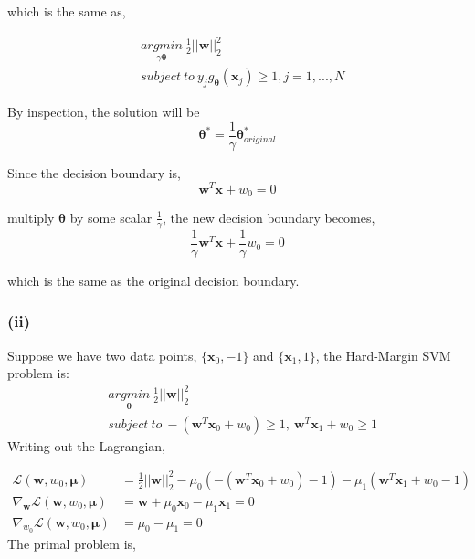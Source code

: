 \documentclass[11pt]{article}
\begin{document}
which is the same as,

\begin{equation}
\begin{split}
&\underset{\gamma\pmb{\theta}}{argmin}\ \frac{1}{2}||\pmb{w}||^2_2 \\
&subject\ to\ y_jg_{\pmb{\theta}}(\pmb{x}_j)\ge 1,j=1,...,N
\end{split}
\end{equation}

By inspection, the solution will be 
$$\pmb{\theta}^* = \frac{1}{\gamma}\pmb{\theta}^*_{original}$$

Since the decision boundary is,
$$\pmb{w}^T\pmb{x} + w_0=0$$

multiply $\pmb{\theta}$ by some scalar $\frac{1}{\gamma}$, the new decision boundary becomes,
$$\frac{1}{\gamma}\pmb{w}^T\pmb{x} + \frac{1}{\gamma} w_0 = 0$$

which is the same as the original decision boundary.
\pagebreak
\subsubsection*{(ii)}
Suppose we have two data points, $\{\pmb{x}_0, -1\}$ and $\{\pmb{x}_1, 1\}$,
the Hard-Margin SVM problem is:
\begin{equation}
\begin{split}
&\underset{\pmb{\theta}}{argmin}\ \frac{1}{2}||\pmb{w}||^2_2\\
&subject\ to\ -(\pmb{w}^T\pmb{x}_0+w_0) \ge 1,\ \pmb{w}^T\pmb{x}_1+w_0 \ge 1
\end{split}
\end{equation}
Writing out the Lagrangian,

\begin{equation}
\begin{split}
\mathcal{L}(\pmb{w},w_0,\pmb{\mu}) &= \frac{1}{2}||\pmb{w}||^2_2 - \mu_0(-(\pmb{w}^T\pmb{x}_0+w_0)-1) - \mu_1(\pmb{w}^T\pmb{x}_1+w_0-1)\\
\nabla_{\pmb{w}}\mathcal{L}(\pmb{w},w_0,\pmb{\mu}) &= \pmb{w} + \mu_0\pmb{x}_0 - \mu_1\pmb{x}_1 = 0\\
\nabla_{w_0}\mathcal{L}(\pmb{w},w_0,\pmb{\mu}) &= \mu_0 - \mu_1 = 0
\end{split}
\end{equation}
The primal problem is,
\end{document}
